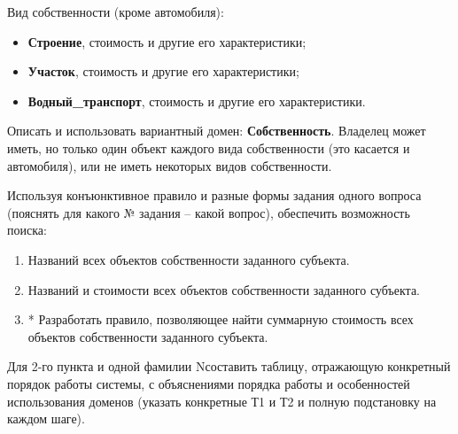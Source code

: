 \documentclass[12pt,a4paper]{scrreprt}
\begin{document}
Вид собственности (кроме автомобиля):

\begin{itemize}
	\item \textbf{Строение}, стоимость и другие его характеристики;
	\item \textbf{Участок}, стоимость и другие его характеристики;
	\item \textbf{Водный\_транспорт}, стоимость и другие его характеристики.
\end{itemize}

Описать и использовать вариантный домен: \textbf{Собственность}. Владелец может иметь,
но только один объект каждого вида собственности (это касается и автомобиля), или не
иметь некоторых видов собственности.

Используя конъюнктивное правило и разные формы задания одного вопроса (пояснять для какого № задания – какой вопрос), обеспечить возможность поиска:

\begin{enumerate}
	\item Названий всех объектов собственности заданного субъекта.
	\item Названий и стоимости всех объектов собственности заданного субъекта.
	\item * Разработать правило, позволяющее найти суммарную стоимость всех
	объектов собственности заданного субъекта.
\end{enumerate}

Для 2-го пункта и одной фамилии Nсоставить таблицу, отражающую конкретный порядок работы системы, с объяснениями порядка работы и особенностей использования доменов (указать конкретные Т1 и Т2 и полную подстановку на каждом шаге).
\end{document}
